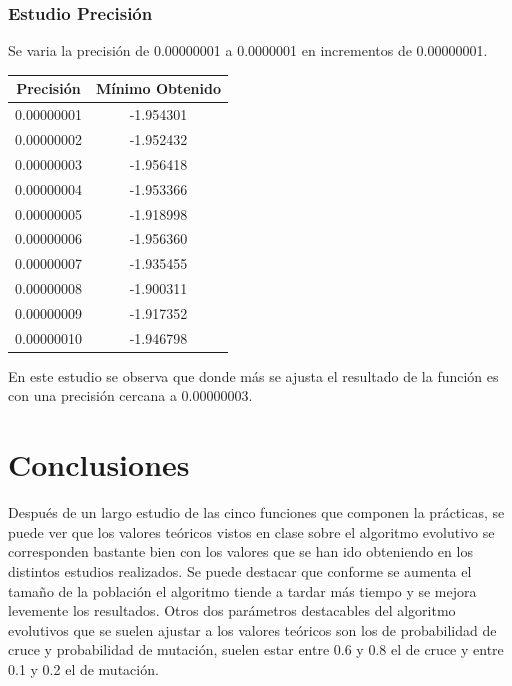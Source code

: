 \documentclass[12pt]{article}
\begin{document}
\subsubsection*{Estudio Precisión}
	Se varia la precisión de 0.00000001 a 0.0000001 en incrementos de 0.00000001.
\begin{table}[H]
\begin{center}
\begin{tabular}{|cc|} \hline
Precisión & Mínimo Obtenido \\  \hline
0.00000001 & -1.954301 \\ 
0.00000002 & -1.952432 \\ 
0.00000003 & -1.956418 \\
0.00000004 & -1.953366 \\
0.00000005 & -1.918998 \\
0.00000006 & -1.956360 \\
0.00000007 & -1.935455 \\
0.00000008 & -1.900311 \\ 
0.00000009 & -1.917352 \\
0.00000010 & -1.946798 \\  \hline
\end{tabular}
\end{center}
\end{table}
	En este estudio se observa que donde más se ajusta el resultado de la función es con una precisión cercana a 0.00000003. 

\section{Conclusiones}
	Después de un largo estudio de las cinco funciones que componen la prácticas, se puede ver que los valores teóricos vistos en clase sobre el algoritmo evolutivo se corresponden bastante bien con los valores que se han ido obteniendo en los distintos estudios realizados. Se puede destacar que conforme se aumenta el tamaño de la población el algoritmo tiende a tardar más tiempo y se mejora levemente los resultados. Otros dos parámetros destacables del algoritmo evolutivos que se suelen ajustar a los valores teóricos son los de probabilidad de cruce y probabilidad de mutación, suelen estar entre 0.6 y 0.8 el de cruce y entre 0.1 y 0.2 el de mutación.	
\end{document}
